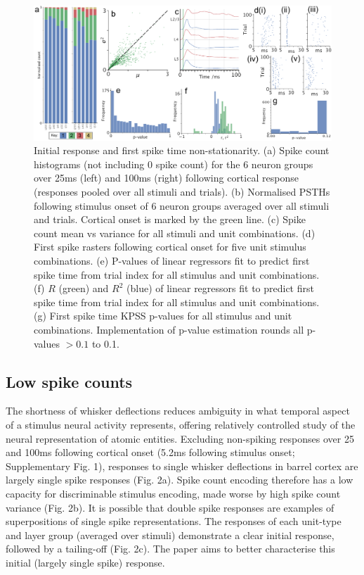 \documentclass{article}
\begin{document}
\begin{figure}[t!]
\centering
\includegraphics[width=\textwidth]{Figure2.pdf}
\caption{Initial response and first spike time non-stationarity. (a) Spike count histograms (not including 0 spike count) for the 6 neuron groups over 25ms (left) and 100ms (right) following cortical response (responses pooled over all stimuli and trials). (b) Normalised PSTHs following stimulus onset of 6 neuron groups averaged over all stimuli and trials. Cortical onset is marked by the green line. (c) Spike count mean vs variance for all stimuli and unit combinations. (d) First spike rasters following cortical onset for five unit stimulus combinations. (e) P-values of linear regressors fit to predict first spike time from trial index for all stimulus and unit combinations. (f) $R$ (green) and $R^2$ (blue) of linear regressors fit to predict first spike time from trial index for all stimulus and unit combinations. (g) First spike time KPSS p-values for all stimulus and unit combinations. Implementation of p-value estimation rounds all p-values $>0.1$ to 0.1.}
\label{fig:universe}
\end{figure}


\subsection*{Low spike counts}

The shortness of whisker deflections reduces ambiguity in what temporal aspect of a stimulus neural activity represents, offering relatively controlled study of the neural representation of atomic entities. Excluding non-spiking responses over 25 and 100ms following cortical onset (5.2ms following stimulus onset; Supplementary Fig. 1), responses to single whisker deflections in barrel cortex are largely single spike responses (Fig. 2a). Spike count encoding therefore has a low capacity for discriminable stimulus encoding, made worse by high spike count variance (Fig. 2b). It is possible that double spike responses are examples of superpositions of single spike representations. The responses of each unit-type and layer group (averaged over stimuli) demonstrate a clear initial response, followed by a tailing-off (Fig. 2c). The paper aims to better characterise this initial (largely single spike) response.
\end{document}
